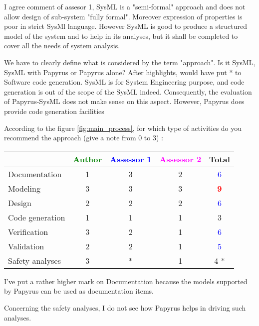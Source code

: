 \begin{assessor2}
I agree comment of assesor 1, SysML is a "semi-formal" approach and does not allow design of sub-system "fully formal". Moreover expression of properties is poor in strict SysMl language.
However SysML is good to produce a structured model of the system  and to help  in its analyses, but it shall be completed to cover all the needs of system analysis.
\end{assessor2}

\begin{author_comment}
We have to clearly define what is considered by the term "approach". Is it SysML, SysML with Papyrus or Papyrus alone?
After highlights, would have put * to Software code generation. SysML is for System Engineering purpose, and code generation is out of the scope of the SysML indeed. Consequently, the evaluation of Papyrus-SysML does not make sense on this aspect. However, Papyrus does provide code generation facilities
\end{author_comment}

According to the figure \ref{fig:main_process}, for which type of activities do you recommend the approach (give a note from 0 to 3) :

\begin{tabular}{|l | c | c | c | c|}
\hline
& \textcolor{green}{Author} & \textcolor{blue}{Assessor 1} & \textcolor{magenta}{Assessor 2} & Total \\
\hline
Documentation & 1    & 3    & 2    & \textcolor{blue}{6} \\
\hline
Modeling & 3    &  3 & 3    & \textcolor{red}{\textbf{9}} \\
\hline
Design & 2    &  2 & 2    & \textcolor{blue}{6} \\
\hline
Code generation & 1    &  1 & 1    & 3    \\
\hline
Verification & 3    &  2 & 1    & \textcolor{blue}{6} \\
\hline
Validation & 2    &  2 & 1    & \textcolor{blue}{5} \\
\hline
Safety analyses & 3    & * & 1    & 4   * \\
\hline
\end{tabular}

\begin{assessor1}
I've put a rather higher mark on Documentation because the models supported by Papyrus can be used as documentation items. 

Concerning the safety analyses, I do not see how Papyrus helps in driving such analyses. 
\end{assessor1}

